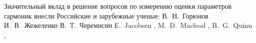 Значительный вклад в решение вопросов по измерению оценки параметров гармоник внесли Российские и зарубежные ученые: 
В.~Н.~Горюнов \cite{Modeling_Questions_Lyutarevich2013, Goryunov2009definition}
И.~В.~Жежеленко \cite{Interharmonics_in_systems_Zhezhelenko_1999, zhezhelenko2010highest}
В.~Т.~Черемисин \cite{Cheremisin1985method, Cheremisin2007method}
E.~Jacobsen \cite{4205098, jacobsen1994local, jacobsen2007fast}, 
M.~D.~Macleod \cite{651200, 1055282},
B.~G.~Quinn \cite{295186, 330402, 558515},
